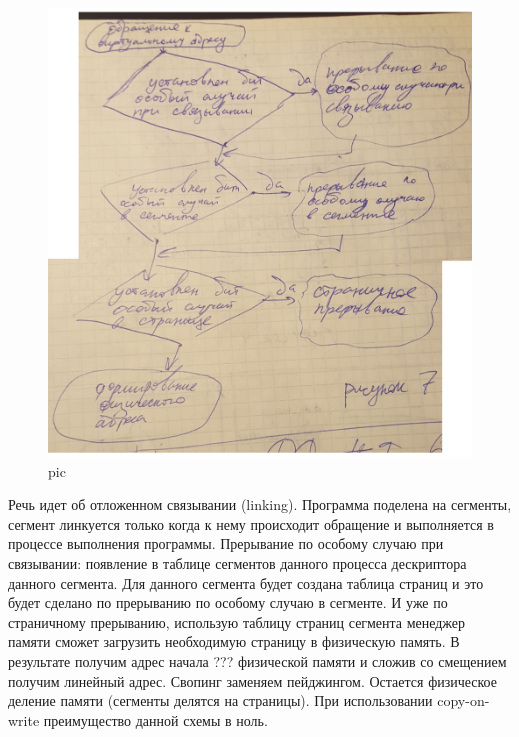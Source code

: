 \begin{figure}[H]
    \centering
    \includegraphics[width=\textwidth]{pic/7.png}
    \caption{pic}
\end{figure}

Речь идет об отложенном связывании (linking). Программа поделена на сегменты, сегмент линкуется только когда к нему происходит обращение и выполняется в процессе выполнения программы.  Прерывание по особому случаю при связывании: появление в таблице сегментов данного процесса дескриптора данного сегмента. Для данного сегмента будет создана таблица страниц и это будет сделано по прерыванию по особому случаю в сегменте. И уже по страничному прерыванию, использую таблицу страниц сегмента менеджер памяти сможет загрузить необходимую страницу в физическую память. В результате получим адрес начала ??? физической памяти и сложив со смещением получим линейный адрес. Свопинг заменяем пейджингом. Остается физическое деление памяти (сегменты делятся на страницы). При использовании copy-on-write преимущество данной схемы в ноль. 

